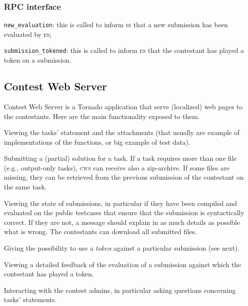 \documentclass[a4paper,8pt]{amsart}
\newcommand{\ES}{\textsc{es}}
\renewcommand{\SS}{\textsc{ss}}
\newcommand{\CWS}{\textsc{cws}}
\newenvironment{squishlist}{%
  \begin{list}{\textbullet}%
    { \setlength{\itemsep}{0pt}%
      \setlength{\parsep}{3pt}%
      \setlength{\topsep}{3pt}%
      \setlength{\partopsep}{0pt}%
      \setlength{\leftmargin}{1.5em}%
      \setlength{\labelwidth}{1em}%
      \setlength{\labelsep}{0.5em} }%
}{\end{list}}
\newcommand{\id}[1]{\texttt{#1}}
\begin{document}
\begin{multicols}{2}
  \subsubsection{RPC interface}

  \begin{squishlist}
  \item \id{new\_evaluation}: this is called to inform \SS{} that a
    new submission has been evaluated by \ES{};
  \item \id{submission\_tokened}: this is called to inform \ES{} that
    the contestant has played a token on a submission.
  \end{squishlist}

  \subsection{Contest Web Server}

  Contest Web Server is a Tornado application that serve (localized)
  web pages to the contestants. Here are the main functionality
  exposed to them.
  \begin{squishlist}
  \item Viewing the tasks' statement and the attachments (that usually
    are example of implementations of the functions, or big example of
    test data).
  \item Submitting a (partial) solution for a task. If a task requires
    more than one file (e.g., output-only tasks), \CWS{} can receive
    also a zip-archive. If some files are missing, they can be
    retrieved from the previous submission of the contestant on the
    same task.
  \item Viewing the state of submissions, in particular if they have
    been compiled and evaluated on the public testcases that ensure
    that the submission is syntactically correct. If they are not, a
    message should explain in as much details as possible what is
    wrong. The contestants can download all submitted files.
  \item Giving the possibility to use a \emph{token\/} against a
    particular submission (see next).
  \item Viewing a detailed feedback of the evaluation of a submission
    against which the contestant has played a token.
  \item Interacting with the contest admins, in particular asking
    questions concerning tasks' statements.
  \end{squishlist}


\end{multicols}
\end{document}
